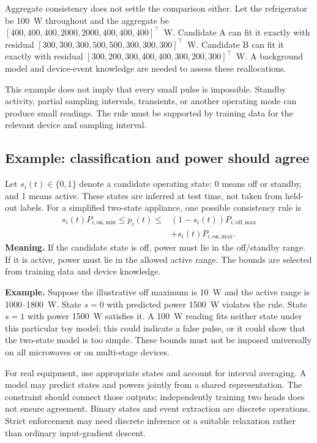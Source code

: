 \documentclass[11pt]{article}
\begin{document}
Aggregate consistency does not settle the comparison either. Let the refrigerator be 100~W throughout and the aggregate be $[400,400,400,2000,2000,400,400,400]^{\top}$~W. Candidate A can fit it exactly with residual $[300,300,300,500,500,300,300,300]^{\top}$~W. Candidate B can fit it exactly with residual $[300,200,300,400,400,300,200,300]^{\top}$~W. A background model and device-event knowledge are needed to assess these reallocations.

This example does not imply that every small pulse is impossible. Standby activity, partial sampling intervals, transients, or another operating mode can produce small readings. The rule must be supported by training data for the relevant device and sampling interval.

\subsection{Example: classification and power should agree}

Let $s_i(t)\in\{0,1\}$ denote a candidate operating state: 0 means off or standby, and 1 means active. These states are inferred at test time, not taken from held-out labels. For a simplified two-state appliance, one possible consistency rule is
\begin{equation}
\begin{split}
    s_i(t)P_{i,\mathrm{on,min}}\leq p_i(t)
    \leq{}&(1-s_i(t))P_{i,\mathrm{off,max}}\\
    &+s_i(t)P_{i,\mathrm{on,max}}.
\end{split}
\label{eq:state_power_logic}
\end{equation}
\textbf{Meaning.} If the candidate state is off, power must lie in the off/standby range. If it is active, power must lie in the allowed active range. The bounds are selected from training data and device knowledge.

\textbf{Example.} Suppose the illustrative off maximum is 10~W and the active range is 1000--1800~W. State $s=0$ with predicted power 1500~W violates the rule. State $s=1$ with power 1500~W satisfies it. A 100~W reading fits neither state under this particular toy model; this could indicate a false pulse, or it could show that the two-state model is too simple. These bounds must not be imposed universally on all microwaves or on multi-stage devices.

For real equipment, use appropriate states and account for interval averaging. A model may predict states and powers jointly from a shared representation. The constraint should connect those outputs; independently training two heads does not ensure agreement. Binary states and event extraction are discrete operations. Strict enforcement may need discrete inference or a suitable relaxation rather than ordinary input-gradient descent.
\end{document}
